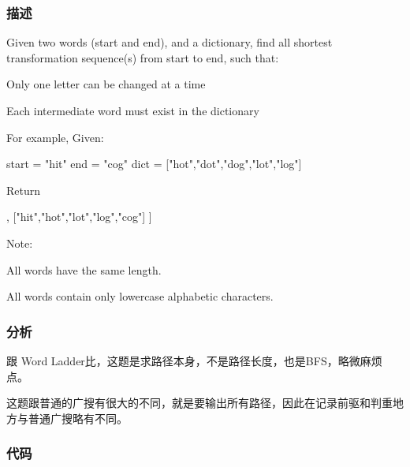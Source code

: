 \subsubsection{描述}
Given two words (start and end), and a dictionary, find all shortest transformation sequence(s) from start to end, such that:
\begindot
\item Only one letter can be changed at a time
\item Each intermediate word must exist in the dictionary
\myenddot

For example, Given:
\begin{Code}
	start = "hit"
	end = "cog"
	dict = ["hot","dot","dog","lot","log"]
\end{Code}
Return
\begin{Code}
	[
	["hit","hot","dot","dog","cog"],
	["hit","hot","lot","log","cog"]
	]
\end{Code}

Note:
\begindot
\item All words have the same length.
\item All words contain only lowercase alphabetic characters.
\myenddot


\subsubsection{分析}
跟 Word Ladder比，这题是求路径本身，不是路径长度，也是BFS，略微麻烦点。

这题跟普通的广搜有很大的不同，就是要输出所有路径，因此在记录前驱和判重地方与普通广搜略有不同。


\subsubsection{代码}

